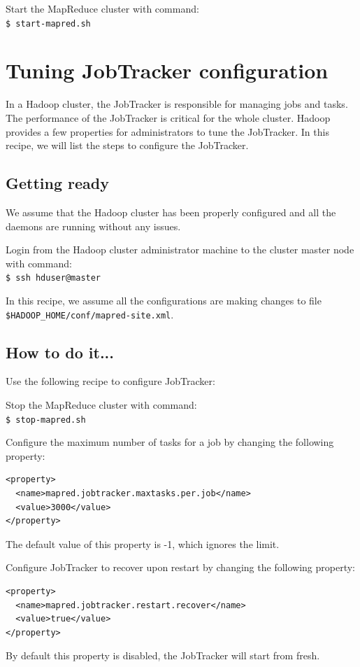 Start the MapReduce cluster with command: \\
\verb|$ start-mapred.sh|

\section{Tuning JobTracker configuration}
In a Hadoop cluster, the JobTracker is responsible for managing jobs and tasks. The performance of the JobTracker is critical for the whole cluster. Hadoop provides a few properties for administrators to tune the JobTracker. In this recipe, we will list the steps to configure the JobTracker.
\subsection*{Getting ready}
We assume that the Hadoop cluster has been properly configured and all the daemons are running without any issues.

Login from the Hadoop cluster administrator machine to the cluster master node with command:\\
\verb|$ ssh hduser@master|

In this recipe, we assume all the configurations are making changes to file \verb|$HADOOP_HOME/conf/mapred-site.xml|.
\subsection*{How to do it...}
Use the following recipe to configure JobTracker:

Stop the MapReduce cluster with command:\\
\verb|$ stop-mapred.sh|

Configure the maximum number of tasks for a job by changing the following property:
\lstset{style=bashstyle}
\begin{lstlisting}
<property>
  <name>mapred.jobtracker.maxtasks.per.job</name>
  <value>3000</value>
</property>
\end{lstlisting}
The default value of this property is -1, which ignores the limit.


Configure JobTracker to recover upon restart by changing the following property:
\lstset{style=bashstyle}
\begin{lstlisting}
<property>
  <name>mapred.jobtracker.restart.recover</name>
  <value>true</value>
</property>
\end{lstlisting}
By default this property is disabled, the JobTracker will start from fresh.


